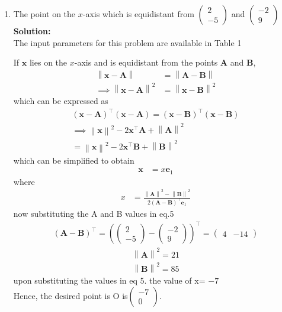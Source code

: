 \documentclass[12pt]{article}
\providecommand{\brak}[1]{\ensuremath{\left(#1\right)}}
\providecommand{\norm}[1]{\left\lVert#1\right\rVert}
\newcommand{\solution}{\noindent \textbf{Solution: }}
\newcommand{\myvec}[1]{\ensuremath{\begin{pmatrix}#1\end{pmatrix}}}
\let\vec\mathbf
\begin{document}
\begin{enumerate}

\item The point on the $x$-axis which is equidistant from $\myvec{2 \\ -5}$ and $\myvec{-2\\9}$\\

\solution \\The input parameters for this problem are available in Table 1
\begin{center}
\begin{table}[ht!]
	
\caption{}
\label{table}	
\end{table}
\end{center}

  If $\vec{x}$ lies on the  $x$-axis and is  equidistant from the points $\vec{A}$ and $\vec{B}$, 
\begin{align}
 \norm{\vec{x}-\vec{A}} &=
\norm{\vec{A}-\vec{B}} 
\\
 \implies \norm{\vec{x}-\vec{A}}^2 &=
\norm{\vec{x}-\vec{B}}^2 
\end{align}
which can be expressed as 
\begin{multline}
 \brak{\vec{x}-\vec{A}}^{\top} \brak{\vec{x}-\vec{A}}=
 \brak{\vec{x}-\vec{B}}^{\top} 
\brak{\vec{x}-\vec{B}}
\\
 \implies \norm{\vec{x}}^2-2{\vec{x}}^{\top}\vec{A} + \norm{\vec{A}}^2
 \\= \norm{\vec{x}}^2-2{\vec{x}}^{\top}\vec{B} + \norm{\vec{B}}^2
\end{multline}
which can be simplified to obtain
  \begin{align}
   \vec{x} &=
    x\vec{e}_1
  \end{align}
  where 
  \begin{align}
   x &=\frac{\norm{\vec{A}}^2 -\norm{\vec{B}}^2 }{2\brak{\vec{A}-\vec{B}}^{\top }\vec{e}_1
}  
  \end{align}
  now substituting the A and B values in eq.5
\begin{align}
 \brak{\vec{A}-\vec{B}}^{\top}=
 \brak{\myvec{2 \\ -5}-\myvec{-2\\9}}^{\top}
 =\myvec{4 & -14}
\end{align}
  \begin{align}
   \norm{\vec{A}}^2 = 21
    \end{align}
 \begin{align}
   \norm{\vec{B}}^2 = 85
    \end{align}
upon   substituting the values in eq 5. the value of x= $ -7$
\\Hence, the desired point is O is$\myvec{ -7 \\ 0}$.


\end{enumerate}
\end{document}
